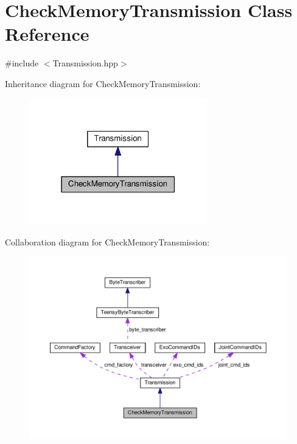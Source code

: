 \hypertarget{classCheckMemoryTransmission}{}\section{Check\+Memory\+Transmission Class Reference}
\label{classCheckMemoryTransmission}


{\ttfamily \#include $<$Transmission.\+hpp$>$}



Inheritance diagram for Check\+Memory\+Transmission\+:\nopagebreak
\begin{figure}[H]
\begin{center}
\leavevmode
\includegraphics[width=219pt]{classCheckMemoryTransmission__inherit__graph}
\end{center}
\end{figure}


Collaboration diagram for Check\+Memory\+Transmission\+:\nopagebreak
\begin{figure}[H]
\begin{center}
\leavevmode
\includegraphics[width=350pt]{classCheckMemoryTransmission__coll__graph}
\end{center}
\end{figure}
